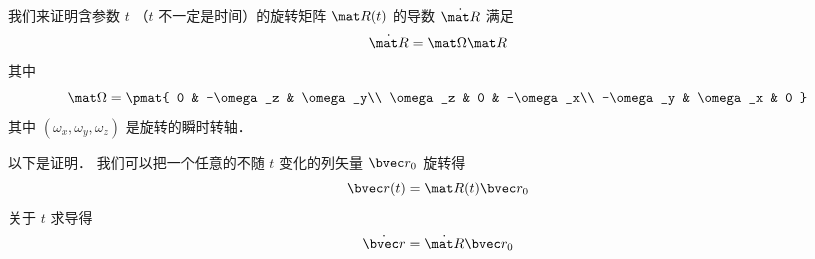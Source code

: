 

我们来证明含参数 $t$ （$t$ 不一定是时间）的旋转矩阵 $\mat R(t)$ 的导数 $\dot{\mat R}$ 满足
\begin{equation}
\dot{\mat R} = \mat \Omega \mat R
\end{equation}
其中
\begin{equation}
\mat \Omega = \pmat{
0 & -\omega_z & \omega_y\\
\omega_z & 0 & -\omega_x\\
-\omega_y & \omega_x & 0
}
\end{equation}
其中 $(\omega_x, \omega_y, \omega_z)$ 是旋转的瞬时转轴．

以下是证明． 我们可以把一个任意的不随 $t$ 变化的列矢量 $\bvec r_0$ 旋转得
\begin{equation}
\bvec r(t) = \mat R(t) \bvec r_0
\end{equation}
关于 $t$ 求导得
\begin{equation}
\dot{\bvec r} = \dot{\mat R} \bvec r_0
\end{equation}
